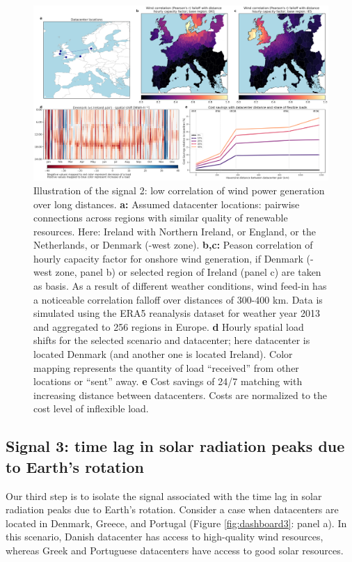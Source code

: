 \begin{figure}
    \centering
    \includegraphics[width=\textwidth]{img/dashboard_2.png}
    \caption{Illustration of the signal 2: low correlation of wind power generation over long distances.
    \textbf{a:} Assumed datacenter locations: pairwise connections across regions with similar quality of renewable resources. Here: Ireland with Northern Ireland, or England, or the Netherlands, or Denmark (-west zone).
    \textbf{b,c:} Peason correlation of hourly capacity factor for onshore wind generation, if Denmark (-west zone, panel b) or selected region of Ireland (panel c) are taken as basis. As a result of different weather conditions, wind feed-in has a noticeable correlation falloff over distances of 300-400 km. Data is simulated using the ERA5 reanalysis dataset for weather year 2013 and aggregated to 256 regions in Europe.
    \textbf{d} Hourly spatial load shifts for the selected scenario and datacenter; here datacenter is located Denmark (and another one is located Ireland). Color mapping represents the quantity of load \enquote{received} from other locations or \enquote{sent} away.
    \textbf{e} Cost savings of 24/7 matching with increasing distance between datacenters. Costs are normalized to the cost level of inflexible load.}
    \label{fig:dashboard2}
\end{figure}


\subsection{Signal 3: time lag in solar radiation peaks due to Earth's rotation}

Our third step is to isolate the signal associated with the time lag in solar radiation peaks due to Earth's rotation. Consider a case when datacenters are located in Denmark, Greece, and Portugal (Figure \ref{fig:dashboard3}: panel a). In this scenario, Danish datacenter has access to high-quality wind resources, whereas Greek and Portuguese datacenters have access to good solar resources.

